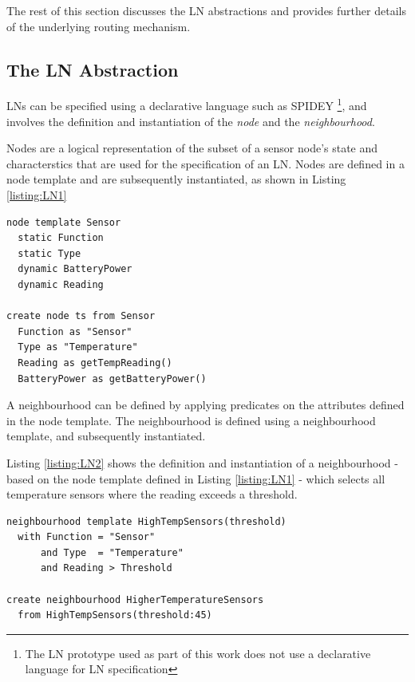 The rest of this section discusses the LN abstractions and provides further
details of the underlying routing mechanism.

\subsection{The LN Abstraction}

LNs can be specified using a declarative language such as SPIDEY
\cite{mottola_LN:2006, mottola_LNScoping:2006}\footnote{The LN prototype used as
part of this work does not use a declarative language for LN specification}, and
involves the definition and instantiation of the \emph{node} and the
\emph{neighbourhood}. 

Nodes are a logical representation of the subset of a sensor node's state and
characterstics that are used for the specification of an LN. Nodes are defined
in a node template and are subsequently instantiated, as shown in Listing \ref{listing:LN1}
   
\begin{lstlisting}[frame=trbl, basewidth={0.55em, 0.6em}, captionpos=b, 
basicstyle=\ttfamily\footnotesize, breaklines, caption = Node Definition and Instantiation, label = listing:LN1]  
node template Sensor
  static Function
  static Type
  dynamic BatteryPower
  dynamic Reading

create node ts from Sensor
  Function as "Sensor"
  Type as "Temperature"
  Reading as getTempReading()
  BatteryPower as getBatteryPower()
\end{lstlisting}

A neighbourhood can be defined by applying predicates on the attributes defined
in the
node template. The neighbourhood is defined using a neighbourhood
template, and subsequently instantiated. 

Listing \ref{listing:LN2} shows the definition and
instantiation of a
neighbourhood - based on the node template defined in Listing \ref{listing:LN1}
- which selects all temperature sensors where the reading exceeds a threshold.
 
\begin{lstlisting}[frame=trbl, basewidth={0.55em, 0.6em}, captionpos=b, 
basicstyle=\ttfamily\footnotesize, breaklines, caption = Neighbourhood Definition and Instantiation, label = listing:LN2]  
neighbourhood template HighTempSensors(threshold)
  with Function = "Sensor" 
      and Type  = "Temperature" 
      and Reading > Threshold

create neighbourhood HigherTemperatureSensors
  from HighTempSensors(threshold:45)
\end{lstlisting}

